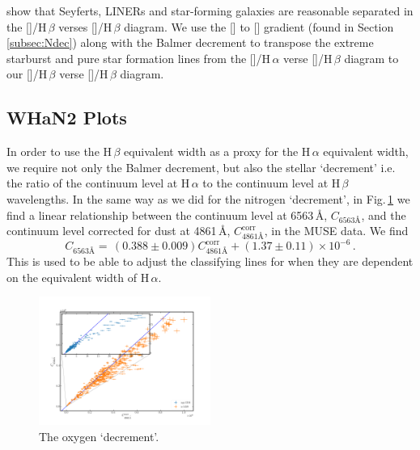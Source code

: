 		\citet{Sarzi2010} show that Seyferts, LINERs and star-forming galaxies are reasonable separated in the []/H\,$\beta$ verses []/H\,$\beta$ diagram. We use the [] to [] gradient (found in Section \ref{subsec:Ndec}) along with the Balmer decrement to transpose the \citet{Kewley2001} extreme starburst and \citet{Kauffmann2003a} pure star formation lines from the []/H\,$\alpha$ verse []/H\,$\beta$ diagram to our  []/H\,$\beta$ verse []/H\,$\beta$ diagram.


	\subsection{WHaN2 Plots}
		\label{subsec:WHaN2}

		In order to use the H\,$\beta$ equivalent width as a proxy for the H\,$\alpha$ equivalent width, we require not only the Balmer decrement, but also the stellar `decrement' i.e. the ratio of the continuum level at H\,$\alpha$ to the continuum level at H\,$\beta$ wavelengths. In the same way as we did for the nitrogen `decrement', in Fig.\,\ref{fig:stellarDec} we find a linear relationship between the continuum level at 6563\,\AA, $C_\text{6563\AA}$, and the continuum level corrected for dust at 4861\,\AA, $C^\text{corr}_\text{4861\AA}$, in the MUSE data. We find
		\begin{equation}
			C_\text{6563\AA} = \, (0.388 \pm 0.009) C^\text{corr}_\text{4861\AA} + (1.37 \pm 0.11) \times 10^{-6} \, .
		\end{equation}
		This is used to be able to adjust the classifying lines for when they are dependent on the equivalent width of H\,$\alpha$. 

		\begin{figure}
			\centering
			\includegraphics[width=0.5\textwidth]{chapter5/stellar_ratio.png}
			\caption[]{The oxygen `decrement'.} 
			\label{fig:stellarDec}
		\end{figure}



